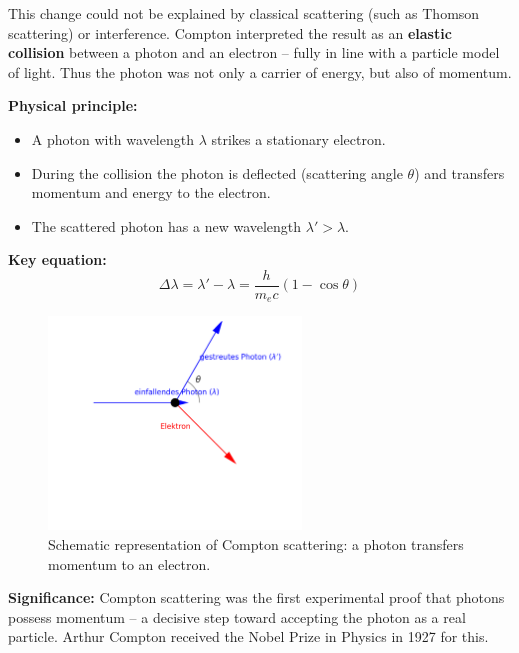 This change could not be explained by classical scattering (such as Thomson scattering) or interference. Compton interpreted the result as an \textbf{elastic collision} between a photon and an electron – fully in line with a particle model of light. Thus the photon was not only a carrier of energy, but also of momentum.

\textbf{Physical principle:}
\begin{itemize}
	\item A photon with wavelength \( \lambda \) strikes a stationary electron.
	\item During the collision the photon is deflected (scattering angle \( \theta \)) and transfers momentum and energy to the electron.
	\item The scattered photon has a new wavelength \( \lambda' > \lambda \).
\end{itemize}

\textbf{Key equation:}
\[
\Delta \lambda = \lambda' - \lambda = \frac{h}{m_e c}(1 - \cos \theta)
\]

\vspace{1em}
\begin{figure}[H]
	\begin{center}
		\includegraphics[width=0.6\textwidth]{bilder/compton-schema.png}
	\end{center}
	\caption{Schematic representation of Compton scattering: a photon transfers momentum to an electron.}
\end{figure}

\textbf{Significance:}  
Compton scattering was the first experimental proof that photons possess momentum – a decisive step toward accepting the photon as a real particle. Arthur Compton received the Nobel Prize in Physics in 1927 for this.
\newpage
\noindent
